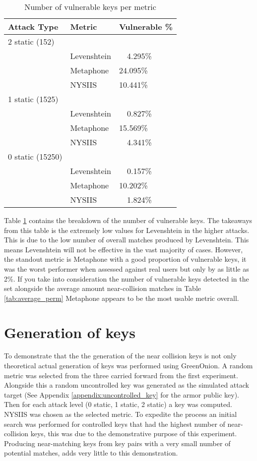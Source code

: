 
\begin{table}[!h]
    \centering
    \begin{tabular}{|lll|}
        \hline
        \textbf{Attack Type} & \textbf{Metric} & \textbf{Vulnerable \%} \\
        \hline 
        2 static (152) && \\ 
        & Levenshtein & ~~4.295\% \\
        & Metaphone & 24.095\% \\
        & NYSIIS & 10.441\% \\
        \hline
        1 static (1525) && \\ 
        & Levenshtein & ~~0.827\% \\
        & Metaphone & 15.569\% \\
        & NYSIIS & ~~4.341\% \\
        \hline
        0 static (15250) && \\ 
        & Levenshtein & ~~0.157\% \\
        & Metaphone & 10.202\% \\
        & NYSIIS & ~~1.824\% \\
        \hline
    \end{tabular}
    \caption{Number of vulnerable keys per metric}
    \label{tab:vulnkeys}
\end{table}

Table \ref{tab:vulnkeys} contains the breakdown of the number of vulnerable keys. The takeaways from this table is the extremely low values for Levenshtein in the higher attacks. This is due to the low number of overall matches produced by Levenshtein. This means Levenshtein will not be effective in the vast majority of cases. However, the standout metric is Metaphone with a good proportion of vulnerable keys, it was the worst performer when assessed against real users but only by as little as 2\%. If you take into consideration the number of vulnerable keys detected in the set alongside the average amount near-collision matches in Table \ref{tab:average_perm} Metaphone appears to be the most usable metric overall.

\section{Generation of keys}
\label{sec:key_gen}
To demonstrate that the the generation of the near collision keys is not only theoretical actual generation of keys was performed using GreenOnion. A random metric was selected from the three carried forward from the first experiment. Alongside this a random uncontrolled key was generated as the simulated attack target (See Appendix \ref{appendix:uncontrolled_key} for the armor public key). Then for each attack level (0 static, 1 static, 2 static) a key was computed. NYSIIS was chosen as the selected metric. To expedite the process an initial search was performed for controlled keys that had the highest number of near-collision keys, this was due to the demonstrative purpose of this experiment. Producing near-matching keys from key pairs with a very small number of potential matches, adds very little to this demonstration.

